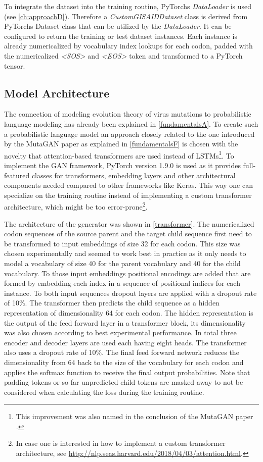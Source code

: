 To integrate the dataset into the training routine, PyTorchs \textit{DataLoader} is used (see \autoref{ch:approachD}). Therefore a \textit{CustomGISAIDDataset} class is derived from PyTorchs Dataset class that can be utilized by the \textit{DataLoader}. It can be configured to return the training or test dataset instances. Each instance is already numericalized by vocabulary index lookups for each codon, padded with the numericalized \textit{<SOS>} and \textit{<EOS>} token and transformed to a PyTorch tensor. 

\subsection{Model Architecture}  \label{ch:approachC}

The connection of modeling evolution theory of virus mutations to probabilistic language modeling has already been explained in \autoref{fundamentalsA}. To create such a probabilistic language model an approach closely related to the one introduced by the MutaGAN paper \cite{Berman2020} as explained in \autoref{fundamentalsF} is chosen with the novelty that attention-based transformers are used instead of \acp{LSTM}\footnote{This improvement was also named in the conclusion of the MutaGAN paper \cite{Berman2020}.}. To implement the \ac{GAN} framework, PyTorch version 1.9.0 is used as it provides full-featured classes for transformers, embedding layers and other architectural components needed compared to other frameworks like Keras. This way one can specialize on the training routine instead of implementing a custom transformer architecture, which might be too error-prone\footnote{In case one is interested in how to implement a custom transformer architecture, see \url{http://nlp.seas.harvard.edu/2018/04/03/attention.html}.}. 

The architecture of the generator was shown in \autoref{transformer}. The numericalized codon sequences of the source parent and the target child sequence first need to be transformed to input embeddings of size 32 for each codon. This size was chosen experimentally and seemed to work best in practice as it only needs to model a vocabulary of size 40 for the parent vocabulary and 40 for the child vocabulary. To those input embeddings positional encodings are added that are formed by embedding each index in a sequence of positional indices for each instance. To both input sequences dropout layers are applied with a dropout rate of 10\%. The transformer then predicts the child sequence as a hidden representation of dimensionality 64 for each codon. The hidden representation is the output of the feed forward layer in a transformer block, its dimensionality was also chosen according to best experimental performance. In total three encoder and decoder layers are used each having eight heads. The transformer also uses a dropout rate of 10\%. The final feed forward network reduces the dimensionality from 64 back to the size of the vocabulary for each codon and applies the softmax function to receive the final output probabilities. Note that padding tokens or so far unpredicted child tokens are masked away to not be considered when calculating the loss during the training routine.

